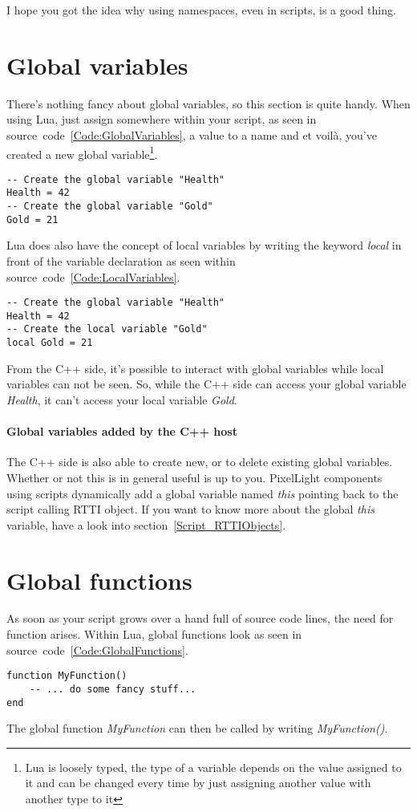 I hope you got the idea why using namespaces, even in scripts, is a good thing.




\section{Global variables}
\label{Script_GlobalVariables}
There's nothing fancy about global variables, so this section is quite handy. When using Lua, just assign somewhere within your script, as seen in source~code~\ref{Code:GlobalVariables}, a value to a name and et voilà, you've created a new global variable\footnote{Lua is loosely typed, the type of a variable depends on the value assigned to it and can be changed every time by just assigning another value with another type to it}.
\begin{lstlisting}[float=htb,label=Code:GlobalVariables,caption={Global variables}]
-- Create the global variable "Health"
Health = 42
-- Create the global variable "Gold"
Gold = 21
\end{lstlisting}

Lua does also have the concept of local variables by writing the keyword \emph{local} in front of the variable declaration as seen within source~code~\ref{Code:LocalVariables}.
\begin{lstlisting}[float=htb,label=Code:LocalVariables,caption={Local variables}]
-- Create the global variable "Health"
Health = 42
-- Create the local variable "Gold"
local Gold = 21
\end{lstlisting}
From the C++ side, it's possible to interact with global variables while local variables can not be seen. So, while the C++ side can access your global variable \emph{Health}, it can't access your local variable \emph{Gold}.

\paragraph{Global variables added by the C++ host}
The C++ side is also able to create new, or to delete existing global variables. Whether or not this is in general useful is up to you. PixelLight components using scripts dynamically add a global variable named \emph{this} pointing back to the script calling RTTI object. If you want to know more about the global \emph{this} variable, have a look into section~\ref{Script_RTTIObjects}.





\section{Global functions}
\label{Script_GlobalFunctions}
As soon as your script grows over a hand full of source code lines, the need for function arises. Within Lua, global functions look as seen in source~code~\ref{Code:GlobalFunctions}.
\begin{lstlisting}[float=htb,label=Code:GlobalFunctions,caption={Global functions}]
function MyFunction()
	-- ... do some fancy stuff...
end
\end{lstlisting}
The global function \emph{MyFunction} can then be called by writing \emph{MyFunction()}.

